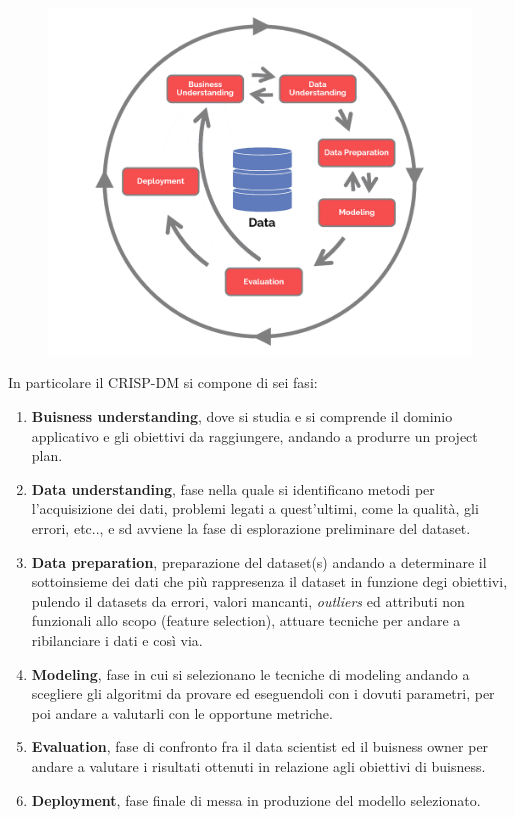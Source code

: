 \documentclass[italian,12pt,a4paper]{article}
\begin{document}
	\begin{figure}[h]
		\centering
		\includegraphics[scale=0.3]{CRISP-DM}
	\end{figure}

	In particolare il CRISP-DM si compone di sei fasi:
	
	\begin{enumerate}
		\item \textbf{Buisness understanding}, dove si studia e si comprende il dominio applicativo e gli obiettivi da raggiungere, andando a produrre un project plan.
		\item \textbf{Data understanding}, fase nella quale si identificano metodi per l'acquisizione dei dati, problemi legati a quest'ultimi, come la qualità, gli errori, etc.., e sd avviene la fase di esplorazione preliminare del dataset.
		\item \textbf{Data preparation}, preparazione del dataset(s) andando a determinare il sottoinsieme dei dati che più rappresenza il dataset in funzione degi obiettivi, pulendo il datasets da errori, valori mancanti, \textit{outliers} ed attributi non funzionali allo scopo (feature selection), attuare tecniche per andare a ribilanciare i dati e così via.
		\item \textbf{Modeling}, fase in cui si selezionano le tecniche di modeling andando a scegliere gli algoritmi da provare ed eseguendoli con i dovuti parametri, per poi andare a valutarli con le opportune metriche.
		\item \textbf{Evaluation}, fase di confronto fra il data scientist ed il buisness owner per andare a valutare i risultati ottenuti in relazione agli obiettivi di buisness.
		\item \textbf{Deployment}, fase finale di messa in produzione del modello selezionato.
	\end{enumerate}
\end{document}
